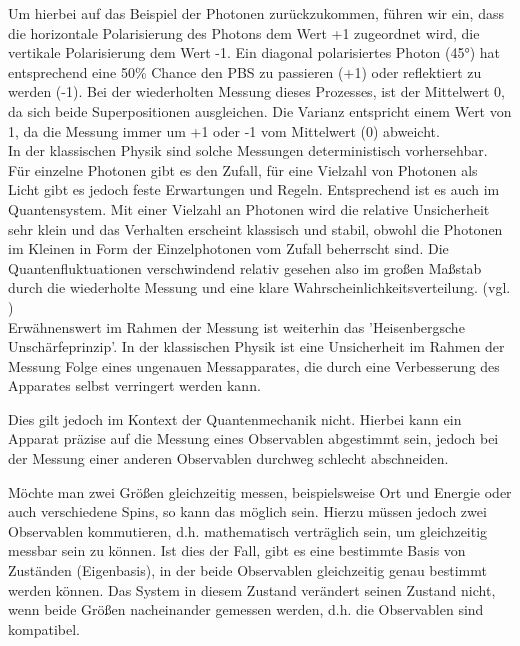 Um hierbei auf das Beispiel der Photonen zurückzukommen, führen wir ein, dass die horizontale Polarisierung des Photons dem Wert +1 zugeordnet wird, die vertikale Polarisierung dem Wert -1.
Ein diagonal polarisiertes Photon (45°) hat entsprechend eine 50\% Chance den PBS zu passieren (+1) oder reflektiert zu werden (-1). Bei der wiederholten Messung dieses Prozesses, ist der Mittelwert 0, da sich beide Superpositionen ausgleichen.
Die Varianz entspricht einem Wert von 1, da die Messung immer um +1 oder -1 vom Mittelwert (0) abweicht. 
\\

In der klassischen Physik sind solche Messungen deterministisch vorhersehbar. Für einzelne Photonen gibt es den Zufall, für eine Vielzahl von Photonen als Licht gibt es jedoch feste Erwartungen und Regeln.
Entsprechend ist es auch im Quantensystem. Mit einer Vielzahl an Photonen wird die relative Unsicherheit sehr klein und das Verhalten erscheint klassisch und stabil, obwohl die Photonen im Kleinen in Form der Einzelphotonen vom Zufall beherrscht sind.
Die Quantenfluktuationen verschwindend relativ gesehen also im großen Maßstab durch die wiederholte Messung und eine klare Wahrscheinlichkeitsverteilung.
(vgl. \cite[Ch. 1.9.2]{kasirajan_fundamentals_2021})
\\ 

Erwähnenswert im Rahmen der Messung ist weiterhin das 'Heisenbergsche Unschärfeprinzip'. In der klassischen Physik ist eine Unsicherheit im Rahmen der Messung Folge eines ungenauen Messapparates, die durch eine Verbesserung des Apparates selbst verringert werden kann. 

Dies gilt jedoch im Kontext der Quantenmechanik nicht. Hierbei kann ein Apparat präzise auf die Messung eines Observablen abgestimmt sein, jedoch bei der Messung einer anderen Observablen durchweg schlecht abschneiden. 

Möchte man zwei Größen gleichzeitig messen, beispielsweise Ort und Energie oder auch verschiedene Spins, so kann das möglich sein. Hierzu müssen jedoch zwei Observablen kommutieren, d.h. mathematisch verträglich sein, um gleichzeitig messbar sein zu können. 
Ist dies der Fall, gibt es eine bestimmte Basis von Zuständen (Eigenbasis), in der beide Observablen gleichzeitig genau bestimmt werden können. Das System in diesem Zustand verändert seinen Zustand nicht, wenn beide Größen nacheinander gemessen werden, d.h. die Observablen sind kompatibel. 

